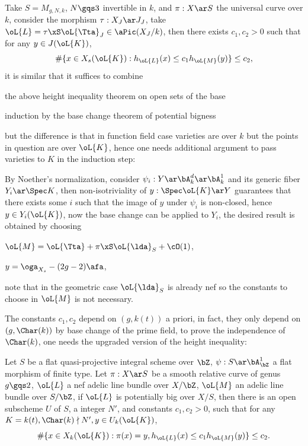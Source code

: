 \documentclass[a4paper, twoside]{article}
\begin{document}
Take $S=M_{g,N,k}$, $N\gqs3$ invertible in $k$, and $\pi:X\ar S$ the universal curve over $k$, consider the morphism $\tau:X_{J}\ar J_{J}$, take $\oL{L}=\tau\xS\oL{\Tta}_{J}\in\aPic(X_{J}/k)$, then there exists $c_{1},c_{2}>0$ such that for any $y\in J(\oL{K})$,
\[
	\#\{x\in X_{s}(\oL{K}):h_{\oL{L}}(x)\leq c_{1}h_{\oL{M}}(y)\}\leq c_{2},
\]
it is similar that it suffices to combine
\begin{enr}
	\item the above height inequality theorem on open sets of the base
	\item induction by the base change theorem of potential bigness
\end{enr}
but the difference is that in function field case varieties are over $k$ but the points in question are over $\oL{K}$, hence one needs additional argument to pass varieties to $K$ in the induction step:

By Noether's normalization, consider $\psi_{i}:Y\ar\bA_{k}^{d}\ar\bA_{k}^{1}$ and its generic fiber $Y_{i}\ar\Spec K$, then non-isotriviality of $y:\Spec\oL{K}\ar Y$ guarantees that there exists some $i$ such that the image of $y$ under $\psi_{i}$ is non-closed, hence $y\in Y_{i}(\oL{K})$, now the base change can be applied to $Y_{i}$, the desired result is obtained by choosing
\begin{enr}
	\item $\oL{M}=\oL{\Tta}+\pi\xS\oL{\lda}_{S}+\cO(1)$,
	\item $y=\oga_{X_{s}}-(2g-2)\afa$,
\end{enr}
note that in the geometric case $\oL{\lda}_{S}$ is already nef so the constants to choose in $\oL{M}$ is not necessary.



The constants $c_{1},c_{2}$ depend on $(g,k(t))$ a priori, in fact, they only depend on $(g,\Char(k))$ by base change of the prime field, to prove the independence of $\Char(k)$, one needs the upgraded version of the height inequality:

\begin{thm}[Theorem~4.8]
	Let $S$ be a flat quasi-projective integral scheme over $\bZ$, $\psi:S\ar\bA_{\bZ}^{1}$ a flat morphism of finite type. Let $\pi:X\ar S$ be a smooth relative curve of genus $g\gqs2$, $\oL{L}$ a nef adelic line bundle over $X/\bZ$, $\oL{M}$ an adelic line bundle over $S/\bZ$, if $\oL{L}$ is potentially big over $X/S$, then there is an open subscheme $U$ of $S$, a integer $N'$, and constants $c_{1},c_{2}>0$, such that for any $K=k(t), \Char(k)\nmid N', y\in U_{k}(\oL{K})$,
	\[
		\#\{x\in X_{k}(\oL{K}):\pi(x)=y, h_{\oL{L}}(x)\leq c_{1}h_{\oL{M}}(y)\}\leq c_{2}.
	\]
\end{thm}
\end{document}
